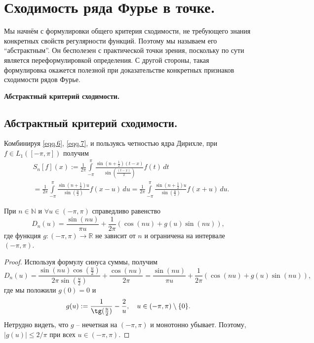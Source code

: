 \section{Сходимость ряда Фурье в точке.}

Мы начнём с формулировки общего критерия сходимости, не требующего знания конкретных свойств регулярности функций. Поэтому мы называем его ``абстрактным''. 
Он бесполезен с практической точки зрения, поскольку по сути является переформулировкой определения. С другой стороны, такая формулировка окажется полезной при доказательстве конкретных
признаков сходимости рядов Фурье. 

\textbf{Абстрактный критерий сходимости.}

\subsection{Абстрактный критерий сходимости.}

Комбинируя \eqref{eqq.6}, \eqref{eqq.7}, и пользуясь четностью ядра Дирихле, при $f \in L_{1}([-\pi,\pi])$ получим
\begin{equation}
	\label{eqq.19}
	\begin{split}
		&S_{n}[f](x):=\frac{1}{2\pi}\int\limits_{-\pi}^{\pi}\frac{\sin(n+\frac{1}{2})(t-x)}{\sin(\frac{(t-x)}{2})}f(t)\,dt \\
		&=\frac{1}{2\pi}\int\limits_{-\pi}^{\pi}\frac{\sin(n+\frac{1}{2})u}{\sin(\frac{u}{2})}f(x-u)\,du =
		\frac{1}{2\pi}\int\limits_{-\pi}^{\pi}\frac{\sin(n+\frac{1}{2})u}{\sin(\frac{u}{2})}f(x+u)\,du.
	\end{split}
\end{equation}

\begin{lemma}
	\label{Lm.convenient_form}
	При $n \in \mathbb{N}$ и $\forall u \in (-\pi,\pi)$ справедливо равенство
	\begin{equation}
		D_{n}(u) = \frac{\sin(nu)}{\pi u} + \frac{1}{2\pi}(\cos(nu)+g(u)\sin(nu)),
	\end{equation}
	где функция $g:(-\pi,\pi) \to \mathbb{R}$ не зависит от $n$ и ограничена на интервале $(-\pi,\pi)$.
\end{lemma}
\begin{proof}
    Используя формулу синуса суммы, получим
\begin{equation}
	D_{n}(u)=\frac{\sin(nu)\cos(\frac{u}{2})}{2\pi\sin(\frac{u}{2})} + \frac{\cos(nu)}{2\pi} = \frac{\sin(nu)}{\pi u}+\frac{1}{2\pi}(\cos(nu)+g(u)\sin(nu)),
\end{equation}
где мы положили $g(0)=0$ и
$$
g(u):=\frac{1}{\tg(\frac{u}{2})}-\frac{2}{u}, \quad u \in (-\pi,\pi) \setminus \{0\}.
$$
Нетрудно видеть, что $g$  -- нечетная на $(-\pi,\pi)$ и монотонно убывает. Поэтому, $|g(u)| \le 2/\pi$ при всех $u \in (-\pi,\pi)$.
\end{proof}

